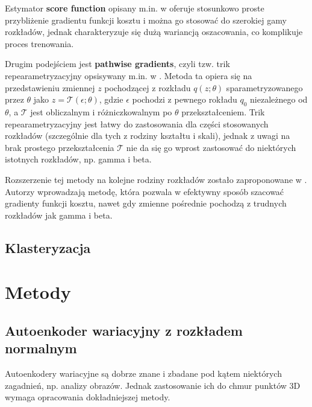 \documentclass{iithesis}
\begin{document}
Estymator \textbf{score function} opisany m.in. w \cite{score_fn} oferuje stosunkowo
proste przybliżenie gradientu funkcji kosztu i można go stosować do szerokiej gamy rozkładów,
jednak charakteryzuje się dużą wariancją oszacowania, co komplikuje proces trenowania.

Drugim podejściem jest \textbf{pathwise gradients}, czyli tzw. trik repearametryzacyjny
opsisywany m.in. w \cite{vae}. Metoda ta opiera się na przedstawieniu zmiennej $z$ pochodzącej
z rozkładu $q(z;\theta)$ sparametryzowanego przez $\theta$ jako $z=\mathcal{T}(\epsilon;\theta)$,
gdzie $\epsilon$ pochodzi z pewnego rokładu $q_0$ niezależnego od $\theta$, a
$\mathcal{T}$ jest obliczalnym i różniczkowalnym po $\theta$ przekształceniem.
Trik repearametryzacyjny jest łatwy do zastosowania dla części stosowanych rozkładów
(szczególnie dla tych z rodziny kształtu i skali), jednak z uwagi na brak prostego przekształcenia
$\mathcal{T}$ nie da się go wprost zastosować do niektórych istotnych rozkładów, np. gamma i beta.

Rozszerzenie tej metody na kolejne rodziny rozkładów zostało zaproponowane w \cite{pathwise_gradients}.
Autorzy wprowadzają metodę, która pozwala w efektywny sposób szacować gradienty funkcji kosztu,
nawet gdy zmienne pośrednie pochodzą z trudnych rozkładów jak gamma i beta.

\section{Klasteryzacja}

\chapter{Metody}
\section{Autoenkoder wariacyjny z rozkładem normalnym}
\label{sec:vae_normal}
Autoenkodery wariacyjne są dobrze znane i zbadane pod kątem niektórych zagadnień,
np. analizy obrazów. Jednak zastosowanie ich do chmur punktów 3D wymaga opracowania
dokładniejszej metody.
\end{document}
